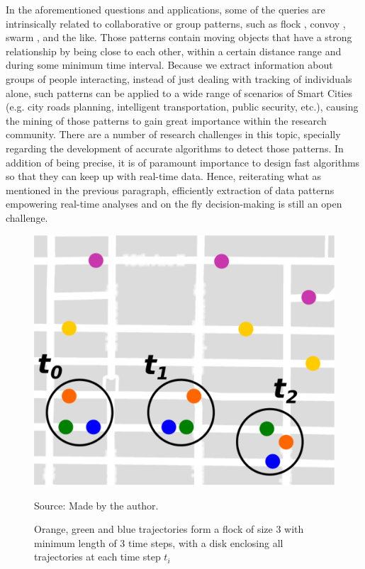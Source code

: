 In the aforementioned questions and applications, some of the queries are intrinsically related to collaborative or
group patterns, such as flock \cite{gudefficient}, convoy \cite{convoy}, swarm \cite{swarm}, and the like. Those
patterns contain moving objects that have a strong relationship by being close to each other, within a certain distance
range and during some minimum time interval. Because we extract information about groups of people interacting, instead
of just dealing with tracking of individuals alone, such patterns can be applied to a wide range of scenarios of Smart
Cities (e.g. city roads planning, intelligent transportation, public security, etc.), causing the mining of those
patterns to gain great importance within the research community. There are a number of research challenges in this
topic, specially regarding the development of accurate algorithms to detect those patterns. In addition of being
precise, it is of paramount importance to design fast algorithms so that they can keep up with real-time data. Hence,
reiterating what as mentioned in the previous paragraph, efficiently extraction of data patterns empowering real-time
analyses and on the fly decision-making is still an open challenge.

\begin{figure}[h!]
    \centering
    \caption{Orange, green and blue trajectories form a flock of size 3 with minimum length of 3 time steps, with a disk
        enclosing all trajectories at each time step $t_i$}
    \centerline{\includegraphics[width=0.7\linewidth]{images/flock_pattern.eps}}
    \footnotesize{Source: Made by the author.}
    \label{fig:flocks}
\end{figure}

